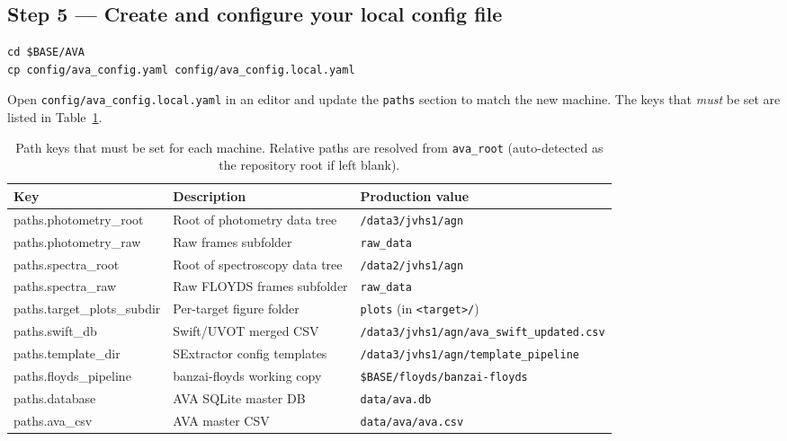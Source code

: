 \documentclass[12pt,a4paper]{article}
\begin{document}
\subsection{Step 5 --- Create and configure your local config file}

\begin{lstlisting}[style=shell]
cd $BASE/AVA
cp config/ava_config.yaml config/ava_config.local.yaml
\end{lstlisting}

Open \texttt{config/ava\_config.local.yaml} in an editor and update the
\texttt{paths} section to match the new machine.  The keys that \emph{must}
be set are listed in Table~\ref{tab:paths}.

\begin{table}[h!]
\centering
\small
\begin{tabular}{>{\ttfamily}p{5.2cm} p{4.5cm} p{4.0cm}}
\toprule
Key & Description & Production value \\
\midrule
paths.photometry\_root   & Root of photometry data tree & \texttt{/data3/jvhs1/agn} \\
paths.photometry\_raw    & Raw frames subfolder         & \texttt{raw\_data} \\
paths.spectra\_root      & Root of spectroscopy data tree & \texttt{/data2/jvhs1/agn} \\
paths.spectra\_raw       & Raw FLOYDS frames subfolder  & \texttt{raw\_data} \\
paths.target\_plots\_subdir & Per-target figure folder   & \texttt{plots} (in \texttt{<target>/}) \\
paths.swift\_db          & Swift/UVOT merged CSV        & \texttt{/data3/jvhs1/agn/ava\_swift\_updated.csv} \\
paths.template\_dir      & SExtractor config templates  & \texttt{/data3/jvhs1/agn/template\_pipeline} \\
paths.floyds\_pipeline   & banzai-floyds working copy   & \texttt{\$BASE/floyds/banzai-floyds} \\
paths.database           & AVA SQLite master DB         & \texttt{data/ava.db} \\
paths.ava\_csv           & AVA master CSV               & \texttt{data/ava/ava.csv} \\
\bottomrule
\end{tabular}
\caption{Path keys that must be set for each machine.  Relative paths are
  resolved from \texttt{ava\_root} (auto-detected as the repository root if
  left blank).}
\label{tab:paths}
\end{table}
\end{document}
